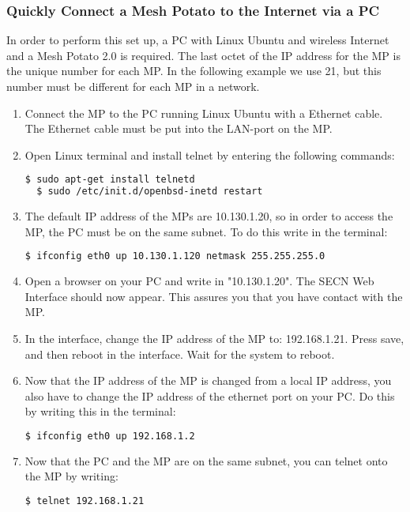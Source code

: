 \subsubsection{Quickly Connect a Mesh Potato to the Internet via a PC}


In order to perform this set up, a PC with Linux Ubuntu and wireless Internet and a Mesh Potato 2.0 is required. The last octet of the IP address for the MP is the unique number for each MP. In the following example we use 21, but this number must be different for each MP in a network. 

\begin{enumerate}
\item Connect the MP to the PC running Linux Ubuntu with a Ethernet cable. The Ethernet cable must be put into the LAN-port on the MP. 
\item Open Linux terminal and install telnet by entering the following commands: 
\noindent
\begin{lstlisting}[language=bash]
  $ sudo apt-get install telnetd
  $ sudo /etc/init.d/openbsd-inetd restart 
\end{lstlisting}
\item The default IP address of the MPs are 10.130.1.20, so in order to access the MP, the PC must be on the same subnet. To do this write in the terminal: 
\noindent
\begin{lstlisting}[language=bash]
  $ ifconfig eth0 up 10.130.1.120 netmask 255.255.255.0
\end{lstlisting}
\item Open a browser on your PC and write in "10.130.1.20". The SECN Web Interface should now appear. This assures you that you have contact with the MP.
\item In the interface, change the IP address of the MP to: 192.168.1.21. Press save, and then reboot in the interface. Wait for the system to reboot. 
\item Now that the IP address of the MP is changed from a local IP address, you also have to change the IP address of the ethernet port on your PC. Do this by writing this in the terminal:
\noindent
\begin{lstlisting}[language=bash]
  $ ifconfig eth0 up 192.168.1.2
\end{lstlisting}
\item Now that the PC and the MP are on the same subnet, you can telnet onto the MP by writing: 
\noindent
\begin{lstlisting}[language=bash]
  $ telnet 192.168.1.21

\end{lstlisting}
\end{enumerate}
